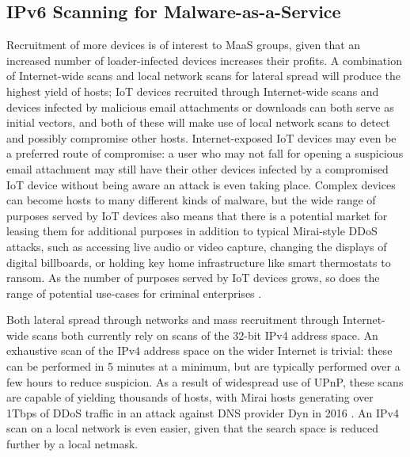 \documentclass[10pt,sigconf]{acmart}
\begin{document}
\subsection{IPv6 Scanning for Malware-as-a-Service}

Recruitment of more devices is of interest to MaaS groups, given that an increased number of loader-infected devices increases their profits.
A combination of Internet-wide scans and local network scans for lateral spread will produce the highest yield of hosts;
IoT devices recruited through Internet-wide scans and devices infected by malicious email attachments or downloads can both serve as initial vectors, and both of these will make use of local network scans to detect and possibly compromise other hosts.
Internet-exposed IoT devices may even be a preferred route of compromise:
a user who may not fall for opening a suspicious email attachment may still have their other devices infected by a compromised IoT device without being aware an attack is even taking place.
Complex devices can become hosts to many different kinds of malware, but the wide range of purposes served by IoT devices also means that there is a potential market for leasing them for additional purposes in addition to typical Mirai-style DDoS attacks, such as accessing live audio or video capture, changing the displays of digital billboards, or holding key home infrastructure like smart thermostats to ransom.
As the number of purposes served by IoT devices grows, so does the range of potential use-cases for criminal enterprises  \cite{antonakakis2017}.


Both lateral spread through networks and mass recruitment through Internet-wide scans both currently rely on scans of the 32-bit IPv4 address space.
An exhaustive scan of the IPv4 address space on the wider Internet is trivial:
these can be performed in 5 minutes at a minimum, but are typically performed over a few hours to reduce suspicion.
As a result of widespread use of UPnP, these scans are capable of yielding thousands of hosts, with Mirai hosts generating over 1Tbps of DDoS traffic in an attack against DNS provider Dyn in 2016 \cite{mirai-traffic}.
An IPv4 scan on a local network is even easier, given that the search space is reduced further by a local netmask.
\end{document}
